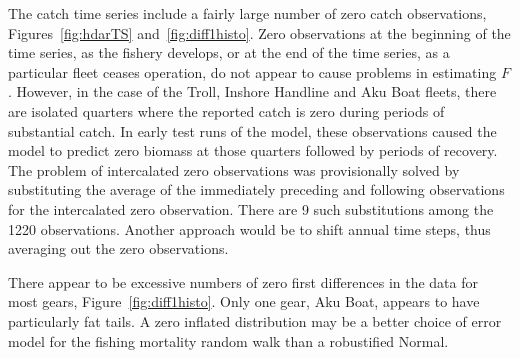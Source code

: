 \documentclass[12pt,letterpaper]{article}
\begin{document}
The catch time series include a fairly large number of zero catch
observations, Figures~\ref{fig:hdarTS} and~\ref{fig:diff1histo}.
Zero observations at the
beginning of the time series, as the fishery develops, or at the end of
the time series, as a particular fleet ceases operation, do not appear
to cause problems in estimating $F$.
However, in the case of the Troll, Inshore Handline and Aku Boat
fleets, there are isolated quarters where the reported catch is zero
during periods of substantial catch.
In early test runs of the model, these observations caused the model to predict
zero biomass at those quarters followed by periods of recovery. 
The problem of intercalated zero observations
was provisionally solved by substituting the average of the immediately
preceding and following observations for the intercalated zero
observation. There are 9 such substitutions among the 1220
observations. Another approach would be to shift annual time steps,
thus averaging out the zero observations.

There appear to be excessive numbers of zero first differences
in the data for most gears, Figure~\ref{fig:diff1histo}. Only one
gear, Aku Boat, appears to have particularly fat tails. A zero
inflated distribution may be a better choice of error model for the
fishing mortality random walk than a robustified Normal.
\end{document}
